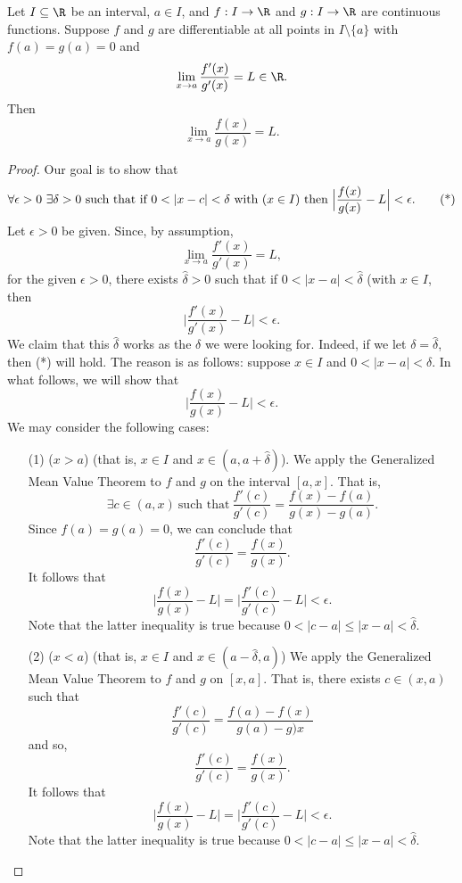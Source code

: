 \begin{theorem}\label{L'Hopital's Rule}
    Let \( I \subseteq  \R   \) be an interval, \( a \in I  \), and \( f: I \to \R  \) and \( g: I \to \R  \) are continuous functions. Suppose \( f  \) and \( g  \) are differentiable at all points in \( I \setminus  \{  a  \}  \) with \( f(a) = g(a) = 0  \) and 
    \[  \lim_{ x \to a }  \frac{ f'(x) }{ g'(x) }  = L \in \R.  \]
    Then 
    \[  \lim_{ x \to a }  \frac{ f(x) }{ g(x) }  = L. \]
\end{theorem}
\begin{proof}
Our goal is to show that 
\[  \forall \epsilon > 0 \ \exists \delta > 0 \ \text{such that if} \ 0 < | x - c  | < \delta \ \text{with (\( x \in I \)) then} \ \Big| \frac{ f(x) }{  g(x) }  - L  \Big|  < \epsilon. \tag{*} \]
Let \( \epsilon > 0  \) be given. Since, by assumption,  
\[  \lim_{ x \to a }  \frac{ f'(x) }{  g'(x) }  = L,  \]
for the given \( \epsilon > 0  \), there exists \( \hat{\delta} > 0 \) such that if \( 0 < |  x - a  |  < \hat{\delta} \) (with \( x \in I  \), then
\[  \Big| \frac{ f'(x) }{ g'(x) }  - L  \Big| < \epsilon. \]
We claim that this \( \hat{\delta} \) works as the \( \delta  \) we were looking for. Indeed, if we let \( \delta = \hat{\delta} \), then (*) will hold. The reason is as follows: suppose \( x \in I  \) and \(  0 < |  x - a  |  < \delta \). In what follows, we will show that  
\[  \Big| \frac{ f(x) }{ g(x) }  - L  \Big|  < \epsilon. \]
We may consider the following cases:
\begin{enumerate}
    \item[(1)] (\( x > a  \)) (that is, \( x \in I  \) and \( x \in (a, a + \hat{\delta}) \)). We apply the Generalized Mean Value Theorem to \( f  \) and \( g  \) on the interval \( [a,x] \). That is,  
        \[  \exists c \in (a,x) \ \text{such that} \ \frac{ f'(c) }{ g'(c) }  = \frac{ f(x) - f(a) }{  g(x) - g(a) }. \]
        Since \( f(a) = g(a) = 0  \), we can conclude that 
        \[  \frac{ f'(c) }{  g'(c) }  = \frac{ f(x) }{ g(x) }. \]
        It follows that 
        \[  \Big| \frac{ f(x) }{  g(x) }  - L  \Big|  = \Big| \frac{ f'(c) }{ g'(c) }  - L  \Big| < \epsilon. \]
        Note that the latter inequality is true because \( 0 < |  c - a  |  \leq |  x - a  |  < \hat{\delta} \).
    \item[(2)] (\( x < a  \)) (that is, \( x \in I  \) and \( x \in (a - \hat{\delta} , a ) \)) We apply the Generalized Mean Value Theorem to \( f  \) and \( g  \) on \( [x,a] \). That is, there exists \( c \in (x,a) \) such that  
        \[  \frac{ f'(c) }{  g'(c) }  = \frac{ f(a) - f(x) }{  g(a) - g)x }  \]
        and so,
        \[  \frac{ f'(c) }{ g'(c) }  = \frac{ f(x) }{ g(x) }. \]
        It follows that 
        \[  \Big| \frac{ f(x) }{ g(x) }  - L  \Big|  = \Big| \frac{ f'(c) }{ g'(c) }  - L  \Big|  < \epsilon. \]
        Note that the latter inequality is true because \( 0 < |  c- a  |  \leq |  x - a  |  < \hat{\delta}. \)

\end{enumerate}
\end{proof}

